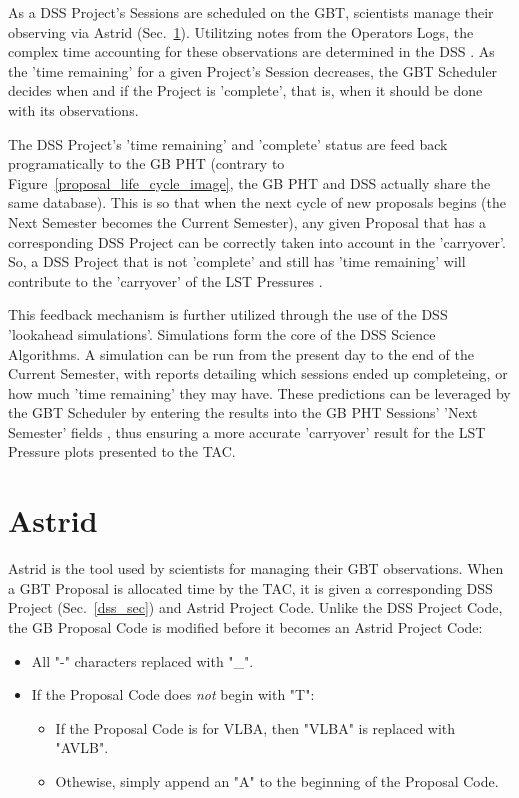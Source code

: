 \documentclass{article}
\begin{document}
As a DSS Project's Sessions are scheduled on the GBT, scientists manage their observing via Astrid (Sec.~\ref{astrid_sec}).  Utilitzing notes from the Operators Logs, the complex time accounting for these observations are determined in the DSS \cite{oneil11a}.  As the 'time remaining' for a given Project's Session decreases, the GBT Scheduler decides when and if the Project is 'complete', that is, when it should be done with its observations.

The DSS Project's 'time remaining' and 'complete' status are feed back
programatically to the GB PHT (contrary to Figure~\ref{proposal_life_cycle_image}, the GB PHT and DSS actually share the same database).  This is so that when the next cycle of new
proposals begins (the Next Semester becomes the Current Semester), any given
Proposal that has a corresponding DSS Project can be correctly taken into
account in the 'carryover'.  So, a DSS Project that is not 'complete' and
still has 'time remaining' will contribute to the 'carryover' of the LST
Pressures \cite{marganian12b}.

This feedback mechanism is further utilized through the use of the DSS
'lookahead simulations'.  Simulations form the core of the DSS Science
Algorithms.  A simulation can be run from the present day to the end of the
Current Semester, with reports detailing which sessions ended up completeing,
or how much 'time remaining' they may have.  These predictions can be leveraged by the GBT Scheduler by entering the results into the GB PHT Sessions' 'Next Semester' fields \cite{marganian12a}, thus ensuring a more accurate 'carryover' result for the LST Pressure plots presented to the TAC.

\section{Astrid}\label{astrid_sec}

Astrid is the tool used by scientists for managing their GBT observations.
When a GBT Proposal is allocated time by the TAC, it is given a corresponding
DSS Project (Sec.~\ref{dss_sec}) and Astrid Project Code. Unlike the DSS Project
Code, the GB Proposal Code is modified before it becomes an Astrid Project
Code:

\begin{itemize}
\item All "-" characters replaced with "\_".
\item If the Proposal Code does {\it not} begin with "T":
    \begin{itemize}
    \item If the Proposal Code is for VLBA, then "VLBA" is replaced with "AVLB".
    \item Othewise, simply append an "A" to the beginning of the Proposal Code.
    \end{itemize}
\end{itemize}
\end{document}
